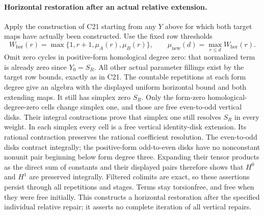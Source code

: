 \paragraph{Horizontal restoration after an actual relative extension.}
Apply the construction of C21 starting from any $Y$
above for which both target maps have actually been
constructed. Use the fixed row thresholds
\[
 W_{\mathrm{hor}}(r)=
       \max\{1,r+1,\mu_A(r),\mu_B(r)\},
 \qquad
 \mu_{\mathrm{new}}(d)=\max_{r\leq d}W_{\mathrm{hor}}(r).
 \tag{AT.70}
\]
Omit zero cycles in positive-form homological degree
zero: that normalized term is already zero since
$Y_0=S_R$.
All other actual parameter fillings exist by the
target row bounds, exactly as in C21.
The countable repetitions at each form degree give
an algebra with the displayed uniform horizontal
bound and both extending maps.
It still has simplex zero $S_R$.
Only the form-zero homological-degree-zero cells
change simplex one, and those are free even-to-odd
vertical disks. Their integral contractions prove
that simplex one still resolves $S_R$ in every weight.
In each simplex every cell is a free vertical
identity-disk extension.
Its rational contraction preserves the rational
coefficient resolution.
The even-to-odd disks contract integrally; the
positive-form odd-to-even disks have no nonconstant
nonunit pair beginning below form degree three.
Expanding their tensor products as the direct sum
of constants and their displayed pairs therefore
shows that $H^0$ and $H^1$ are preserved integrally.
Filtered colimits are exact, so these assertions
persist through all repetitions and stages.
Terms stay torsionfree, and free when they were
free initially.
This constructs a horizontal restoration after the
specified individual relative repair; it asserts
no complete iteration of all vertical repairs.

